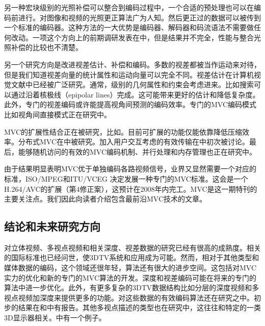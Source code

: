 另一种宏块级别的光照补偿可以整合到编码过程中，一个合适的预处理也可以在编码前进行。对图像和视频的光照更正算法广为人知。然后更正过的数据可以被传到一个标准的编码器。这种方法的一大优势是编码器、解码器和码流语法不需要做任何改动。一项这个方向上的前期调研发表在中，但是结果并不完全，性能与整合光照补偿的比较也不清楚。

另一个研究方向是改进视差估计、补偿和编码\cite{lu2009effective}。多数的视差都被当作运动来对待，但是我们知道视差向量的统计属性和运动向量可以完全不同。视差估计在计算机视觉文献中已经被广泛研究。通常，级别的几何属性和约束会考虑进来。比如搜索可以通过沿着核极线（epipolar lines）完成。这可能带来更好的估计和降低复杂度。此外，专门的视差编码或许能提高视角间预测的编码效率。专门的MVC编码模式比如视角间直接模式\cite{guo2006inter}正在研究中。

MVC的扩展性结合正在被研究，比如。目前可扩展的功能仅能依靠降低压缩效率。分布式MVC在中被研究。加入用户交互考虑的有效传输在中初次被讨论。最后，能够随机访问的有效的MVC编码机制、并行处理和内存管理也正在研究中。

由于结果明显表明MVC优于单独编码各路视频信号，业界又显然需要一个对应的标准，ISO/MPEG和ITU/VCEG 决定发展一种专门的MVC标准\cite{vetro-joint, vetro2006joint}。这会是一个H.264/AVC的扩展（第4修正案），这预计在2008年内完工。MVC是这一期特刊的主要关注点。我们因此向读者介绍包含最前沿MVC技术的文章。

\subsection{结论和未来研究方向}

对立体视频、多视点视频和相关深度、视差数据的研究已经有很高的成熟度。相关的国际标准也已经问世，使3DTV系统和应用成为可能。然而，相对于其他类型和媒体数据的编码，这个领域还很年轻，算法还有很大的进步空间。这包括对MVC实力的优化和新的专门的MVC算法的开发。深度和视差编码可能在将来的专门的算法中进一步优化。此外，有更多复杂的3DTV数据结构比如分层的深度视频和多视点视频加深度来提供更多的功能。对这些数据的有效编码算法还在研究之中。初步的结果在和中有报告。其他多视点描述的类型也在研究中，这往往和特定的一类3D显示器相关。中有一个例子。

